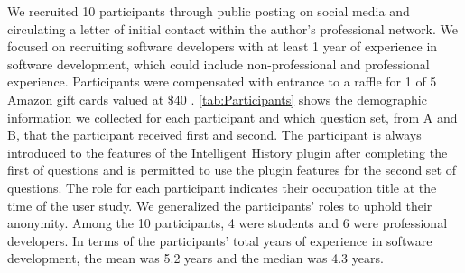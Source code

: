 We recruited 10 participants through public posting on social media and circulating a letter of initial contact within the author's professional network.
We focused on recruiting software developers with at least 1 year of experience in software development, 
which could include non-professional and professional experience.
Participants were compensated with entrance to a raffle for 1 of 5 Amazon gift cards valued at $\$40$ .
\autoref{tab:Participants} shows the demographic information we collected for each participant and 
which question set, from A and B, that the participant received first and second.
The participant is always introduced to the features of the Intelligent History plugin after completing the first of questions and 
is permitted to use the plugin features for the second set of questions.
The role for each participant indicates their occupation title at the time of the user study.
We generalized the participants' roles to uphold their anonymity.
Among the 10 participants, 4 were students and 6 were professional developers.
In terms of the participants' total years of experience in software development, 
the mean was 5.2 years and the median was 4.3 years.

